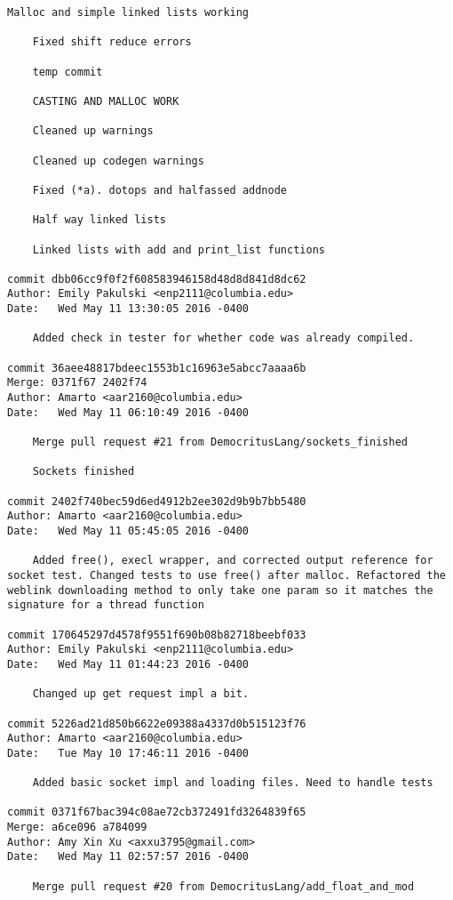 \begin{lstlisting}[backgroundcolor=\color{white}]
    Malloc and simple linked lists working
    
    Fixed shift reduce errors
    
    temp commit
    
    CASTING AND MALLOC WORK
    
    Cleaned up warnings
    
    Cleaned up codegen warnings
    
    Fixed (*a). dotops and halfassed addnode
    
    Half way linked lists
    
    Linked lists with add and print_list functions

commit dbb06cc9f0f2f608583946158d48d8d841d8dc62
Author: Emily Pakulski <enp2111@columbia.edu>
Date:   Wed May 11 13:30:05 2016 -0400

    Added check in tester for whether code was already compiled.

commit 36aee48817bdeec1553b1c16963e5abcc7aaaa6b
Merge: 0371f67 2402f74
Author: Amarto <aar2160@columbia.edu>
Date:   Wed May 11 06:10:49 2016 -0400

    Merge pull request #21 from DemocritusLang/sockets_finished
    
    Sockets finished

commit 2402f740bec59d6ed4912b2ee302d9b9b7bb5480
Author: Amarto <aar2160@columbia.edu>
Date:   Wed May 11 05:45:05 2016 -0400

    Added free(), execl wrapper, and corrected output reference for socket test. Changed tests to use free() after malloc. Refactored the weblink downloading method to only take one param so it matches the signature for a thread function

commit 170645297d4578f9551f690b08b82718beebf033
Author: Emily Pakulski <enp2111@columbia.edu>
Date:   Wed May 11 01:44:23 2016 -0400

    Changed up get request impl a bit.

commit 5226ad21d850b6622e09388a4337d0b515123f76
Author: Amarto <aar2160@columbia.edu>
Date:   Tue May 10 17:46:11 2016 -0400

    Added basic socket impl and loading files. Need to handle tests

commit 0371f67bac394c08ae72cb372491fd3264839f65
Merge: a6ce096 a784099
Author: Amy Xin Xu <axxu3795@gmail.com>
Date:   Wed May 11 02:57:57 2016 -0400

    Merge pull request #20 from DemocritusLang/add_float_and_mod
    

\end{lstlisting}
